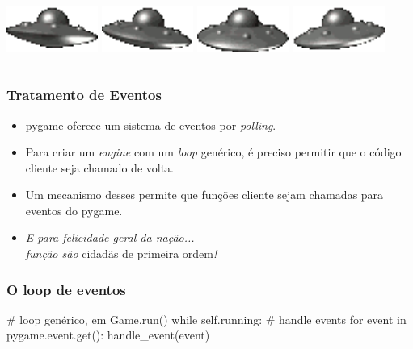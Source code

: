 \begin{frame}
\begin{columns}
        \begin{column}{0.3\textwidth}
            \includegraphics[width=3cm]{images/out0002.png}
            \vfill
            \includegraphics[width=3cm]{images/out0005.png}
            \vfill
            \includegraphics[width=3cm]{images/out0008.png}
            \vfill
            \includegraphics[width=3cm]{images/out0011.png}
        \end{column}
    \end{columns}
\end{frame}

\begin{frame}
    \frametitle{Tratamento de Eventos}

    \begin{itemize}
        \item pygame oferece um sistema de eventos por \textit{polling}.
        \item Para criar um \textit{engine} com um \textit{loop} genérico,
        é preciso permitir que o código cliente seja chamado de volta.
        \item Um mecanismo desses permite que funções cliente sejam chamadas
        para eventos do pygame.
        \item \textit{E para felicidade geral da nação...\\ função são} cidadãs de primeira ordem\textit{!}
    \end{itemize}
\end{frame}

\begin{frame}[fragile]
    \frametitle{O loop de eventos}

    \begin{python}
# loop genérico, em Game.run()
while self.running:
    # handle events
    for event in pygame.event.get():
        handle_event(event)
    \end{python}
\end{frame}

